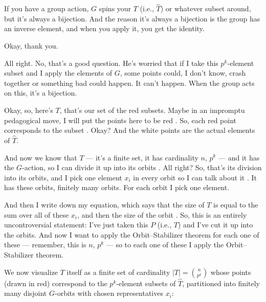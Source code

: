 \begin{proofWrapper}
\begin{speech}[00:51:26 - 00:51:46]
If you have a group action, $G$ spins your $T$ (i.e., $\widehat{T}$) or whatever subset around, but it's always a bijection. And the reason it's always a bijection is the group has an inverse element, and when you apply it, you get the identity.
\end{speech}

\begin{student}
Okay, thank you.
\end{student}

\begin{speech}[00:51:48 - 00:53:29]
All right. No, that's a good question. He's worried that if I take this $p^k$-element subset and I apply the elements of $G$, some points could, I don't know, crash together or something bad could happen. It can't happen. When the group acts on this, it's a bijection.

Okay, so, here's $T$, that's our set of the red subsets. Maybe in an impromptu pedagogical move, I will put the points here to be red . So, each red point corresponds to the subset . Okay? And the white points  are the actual elements of $\widehat{T}$.

And now we know that $T$ --- it's a finite set, it has cardinality $n$, $p^k$  --- and it has the $G$-action, so I can divide it up into its orbits . All right? So, that's its division into its orbits, and I pick one element $x_i$ in every orbit so I can talk about it . It has these orbits, finitely many orbits. For each orbit I pick one element.

And then I write down my equation, which says that the size of $T$ is equal to the sum over all of these $x_i$, and then the size of the orbit . So, this is an entirely uncontroversial statement: I've just taken this $P$ (i.e., $T$) and I've cut it up into the orbits. And now I want to apply the Orbit--Stabilizer theorem for each one of these --- remember, this is $n$, $p^k$ --- so to each one of these I apply the Orbit--Stabilizer theorem.
\end{speech}

\begin{content}
We now visualize $T$ itself as a finite set of cardinality $|T| = \binom{n}{p^k}$ whose points (drawn in red) correspond to the $p^k$-element subsets of $\widehat{T}$, partitioned into finitely many disjoint $G$-orbits with chosen representatives $x_i$:


\end{content}
\end{proofWrapper}
